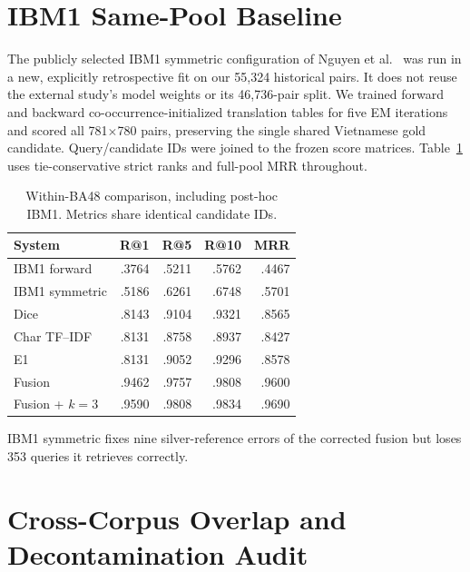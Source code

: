 \section{IBM1 Same-Pool Baseline}\label{app:ibm1}
The publicly selected IBM1 symmetric configuration of Nguyen et al.~\cite{nguyen2026parallelretrieval} was run in a new, explicitly retrospective fit on our 55,324 historical pairs. It does not reuse the external study's model weights or its 46,736-pair split. We trained forward and backward co-occurrence-initialized translation tables for five EM iterations and scored all 781$\times$780 pairs, preserving the single shared Vietnamese gold candidate. Query/candidate IDs were joined to the frozen score matrices. Table~\ref{tab:ibm1} uses tie-conservative strict ranks and full-pool MRR throughout.
\begin{table}[h]
\centering\small
\caption{Within-BA48 comparison, including post-hoc IBM1. Metrics share identical candidate IDs.}
\label{tab:ibm1}

\begin{tabular}{lrrrr}
\toprule
System & R@1 & R@5 & R@10 & MRR \\
\midrule
IBM1 forward & .3764 & .5211 & .5762 & .4467 \\
IBM1 symmetric & .5186 & .6261 & .6748 & .5701 \\
Dice & .8143 & .9104 & .9321 & .8565 \\
Char TF--IDF & .8131 & .8758 & .8937 & .8427 \\
E1 & .8131 & .9052 & .9296 & .8578 \\
Fusion & .9462 & .9757 & .9808 & .9600 \\
Fusion + $k=3$ & .9590 & .9808 & .9834 & .9690 \\
\bottomrule
\end{tabular}
\end{table}

IBM1 symmetric fixes nine silver-reference errors of the corrected fusion but loses 353 queries it retrieves correctly.

\section{Cross-Corpus Overlap and Decontamination Audit}\label{app:corpus}
